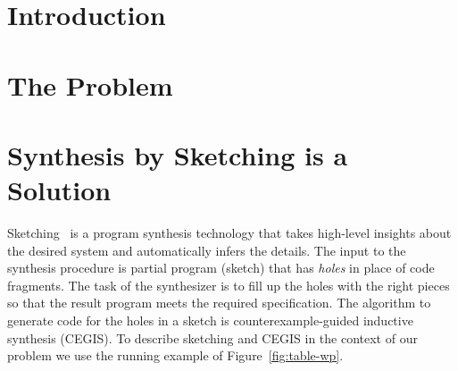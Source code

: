 \section{Introduction}


\section{The Problem}

\section{Synthesis by Sketching is a Solution}


Sketching~\cite{armando-thesis,armando2013sketch} is a program synthesis technology that 
takes high-level insights about the desired system and automatically infers the details.
The input to the synthesis procedure is partial program (sketch) that has {\em holes}
in place of code fragments.
The task of the synthesizer is to fill up the holes with the right pieces so that the 
result program meets the required specification.  
The algorithm to generate code for the holes in a sketch is counterexample-guided inductive synthesis (CEGIS).
To describe sketching and CEGIS in the context of our problem we use the running 
example of Figure~\ref{fig:table-wp}.


